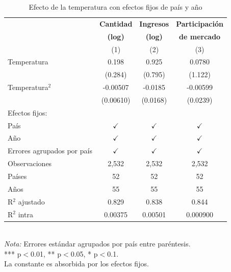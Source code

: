 \begin{table}[H]
\centering
\caption{Efecto de la temperatura con efectos fijos de país y año}
\label{tab:regresiones_fe}
\begin{tabular}{lccc}
\toprule
& \textbf{Cantidad} & \textbf{Ingresos} & \textbf{Participación} \\
& \textbf{(log)} & \textbf{(log)} & \textbf{de mercado} \\
& (1) & (2) & (3) \\
\midrule
Temperatura & 0.198 & 0.925 & 0.0780 \\
& (0.284) & (0.795) & (1.122) \\
Temperatura$^2$ & -0.00507 & -0.0185 & -0.00599 \\
& (0.00610) & (0.0168) & (0.0239) \\
\midrule
Efectos fijos: & & & \\
\quad País & $\checkmark$ & $\checkmark$ & $\checkmark$ \\
\quad Año & $\checkmark$ & $\checkmark$ & $\checkmark$ \\
Errores agrupados por país & $\checkmark$ & $\checkmark$ & $\checkmark$ \\
\midrule
Observaciones & 2,532 & 2,532 & 2,532 \\
Países & 52 & 52 & 52 \\
Años & 55 & 55 & 55 \\
R$^2$ ajustado & 0.829 & 0.838 & 0.844 \\
R$^2$ intra & 0.00375 & 0.00501 & 0.000900 \\
\bottomrule
\end{tabular}
\\
\vspace{0.5em}
\footnotesize{\textit{Nota:} Errores estándar agrupados por país entre paréntesis. \\
*** p$<$0.01, ** p$<$0.05, * p$<$0.1. \\
La constante es absorbida por los efectos fijos.}
\end{table}
